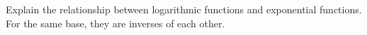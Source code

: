 {Explain the relationship between logarithmic functions and exponential functions.}
{For the same base, they are inverses of each other.}
